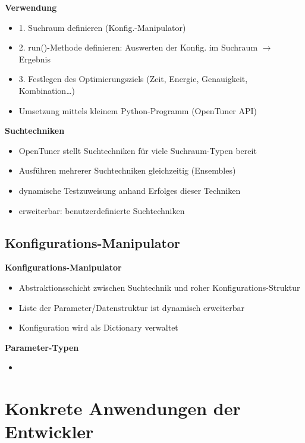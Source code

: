   \begin{frame}
  \textbf{Verwendung}
  \begin{itemize}
    \item 1. Suchraum definieren (Konfig.-Manipulator)
    \item 2. run()-Methode definieren: Auswerten der Konfig. im Suchraum $\rightarrow$ Ergebnis
    \item 3. Festlegen des Optimierungsziels (Zeit, Energie, Genauigkeit, Kombination…)
    \item Umsetzung mittels kleinem Python-Programm (OpenTuner API)
  \end{itemize}
  \textbf{Suchtechniken}
  \begin{itemize}
    \item OpenTuner stellt Suchtechniken für viele Suchraum-Typen bereit
    \item Ausführen mehrerer Suchtechniken gleichzeitig (Ensembles)
    \item dynamische Testzuweisung anhand Erfolges dieser Techniken
    \item erweiterbar: benutzerdefinierte Suchtechniken
  \end{itemize}
  \end{frame}
  

  \subsection{Konfigurations-Manipulator}

  \begin{frame}
  \textbf{Konfigurations-Manipulator}
  \begin{itemize}
    \item Abstraktionsschicht zwischen Suchtechnik und roher Konfigurations-Struktur
    \item Liste der Parameter/Datenstruktur ist dynamisch erweiterbar
    \item Konfiguration wird als Dictionary verwaltet
  \end{itemize}
  \textbf{Parameter-Typen}
  \begin{itemize}
    \item 
  \end{itemize}
  \end{frame}

    

    
    \section{Konkrete Anwendungen der Entwickler}
    
